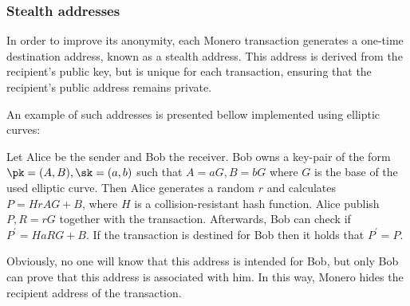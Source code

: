 \subsubsection{Stealth addresses}

In order to improve its anonymity, each Monero transaction generates a one-time destination address, known as a stealth address. This address is derived from the recipient's public key, but is unique for each transaction, ensuring that the recipient's public address remains private.

An example of such addresses is presented bellow implemented using elliptic curves:

Let Alice be the sender and Bob the receiver. Bob owns a key-pair of the form $\pk = (A,B), \sk = (a,b)$ such that $A = aG, B= bG$ where $G$ is the base of the used elliptic curve. Then Alice generates a random $r$ and calculates $P = H{rA}G + B$, where $H$ is a collision-resistant hash function. Alice publish $P, R = rG$ together with the transaction. Afterwards, Bob can check if $P^\prime = H{aR}G + B$. If the transaction is destined for Bob then it holds that $P^\prime = P$.

Obviously, no one will know that this address is intended for Bob, but only Bob can prove that this address is associated with him. In this way, Monero hides the recipient address of the transaction.

